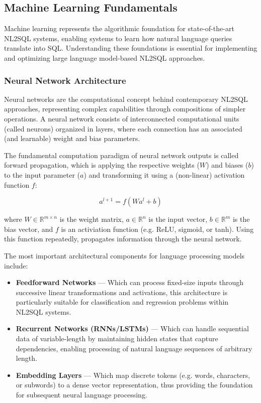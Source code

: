 \subsection{Machine Learning Fundamentals}

Machine learning represents the algorithmic foundation for state-of-the-art NL2SQL systems, enabling systems to learn how natural
language queries translate into SQL. Understanding these foundations is essential for implementing and optimizing large language
model-based NL2SQL approaches.

\subsubsection{Neural Network Architecture}

Neural networks are the computational concept behind contemporary NL2SQL approaches, representing complex capabilities through
compositions of simpler operations. A neural network consists of interconnected computational units (called neurons) organized
in layers, where each connection has an associated (and learnable) weight and bias parameters.

The fundamental computation paradigm of neural network outputs is called forward propagation, which is applying the respective weights ($W$)
and biases ($b$) to the input parameter ($a$) and transforming it using a (non-linear) activation function $f$:

\begin{equation}
a^{l+1} = f(Wa^l + b)
\end{equation}

where $W \in \mathbb{R}^{m \times n}$ is the weight matrix, $a \in \mathbb{R}^{n}$ is the input vector, $b \in \mathbb{R}^{m}$ is
the bias vector, and $f$ is an activiation function (e.g. ReLU, sigmoid, or tanh). Using this function repeatedly, propagates information
through the neural network.

The most important architectural components for language processing models include:

\begin{itemize}
    \item \textbf{Feedforward Networks} — Which can process fixed-size inputs through successive linear transformations and activations,
          this architecture is particularly suitable for classification and regression problems within NL2SQL systems.
    \item \textbf{Recurrent Networks (RNNs/LSTMs)} — Which can handle sequential data of variable-length by maintaining hidden states
          that capture dependencies, enabling processing of natural language sequences of arbitrary length.
    \item \textbf{Embedding Layers} — Which map discrete tokens (e.g. words, characters, or subwords) to a dense vector representation,
          thus providing the foundation for subsequent neural language processing.
\end{itemize}

